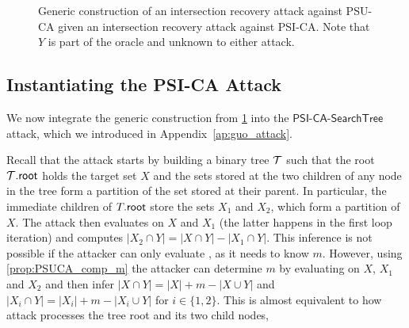 \begin{figure}
	\centering
	\begin{pchstack}
		\pchspace
	\end{pchstack}
	\caption{Generic construction of an intersection recovery attack \bdv{} against PSU-CA given an intersection recovery attack \adv{} against PSI-CA. 
	Note that $Y$ is part of the oracle and unknown to either attack.}
	\label{fig:PSUCA_generic}
\end{figure}

\subsection{Instantiating the PSI-CA Attack}\label{attack:PSUCA}

We now integrate the generic construction from \ref{fig:PSUCA_generic} into
the $\mathsf{PSI\text{-}CA\text{-}Search}\allowbreak\mathsf{Tree}$ attack,
which we introduced in Appendix~\ref{ap:guo_attack}.  

Recall that the attack starts
by building a binary tree $\mathcal{T}$ such that the root $\mathcal{T}.\mathsf{root}$ holds the
target set $X$ and the sets stored at the two children of any node in the tree
form a partition of the set stored at their parent.  In particular, the
immediate children of $T.\mathsf{root}$ store the sets $X_1$ and $X_2$, which form
a partition of $X$.  The attack then evaluates \PSICA{} on $X$ and $X_1$ (the
latter happens in the first loop iteration) and computes
$|X_2 \cap Y| = |X \cap Y| - |X_1 \cap Y|$.  This inference is not possible if
the attacker can only evaluate \PSUCA, as it needs to know $m$.  However,
using \ref{prop:PSUCA_comp_m} the attacker can determine $m$ by evaluating
\PSUCA on $X$, $X_1$ and $X_2$ and then infer
$|X \cap Y| = |X| + m - |X \cup Y|$ and
$|X_i \cap Y| = |X_i| + m - |X_i \cup Y|$ for $i\in\{1,2\}$.  This is almost
equivalent to how \PSICA attack processes the tree root and its two child
nodes,

